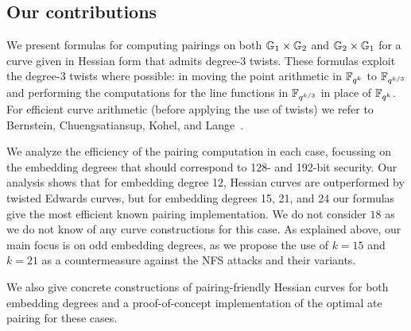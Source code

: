 


\subsection{Our contributions}

We present formulas for computing pairings on both $\mathbb{G}_{1} \times \mathbb{G}_{2}$ and $\mathbb{G}_{2} \times \mathbb{G}_{1}$ for a curve given in Hessian form that admits degree-3 twists.
These formulas exploit the degree-3 twists where possible: in moving the point arithmetic in $\mathbb{F}_{q^k}$ to $\mathbb{F}_{q^{k/3}}$ and performing the computations for the line functions in $\mathbb{F}_{q^{k/3}}$ in place of $\mathbb{F}_{q^k}$.
For efficient curve arithmetic (before applying the use of twists) we refer to
Bernstein, Chuengsatiansup, Kohel, and Lange~\cite{2015/hessian}.

We analyze the efficiency of the pairing computation in each case, focussing on the embedding degrees that should correspond to 128- and 192-bit security. 
Our analysis shows that for embedding degree 12, Hessian curves are outperformed by twisted Edwards curves, but for embedding degrees 15, 21, and 24
our formulas give the most efficient known pairing implementation.
We do not consider $18$ as we do not know of any curve constructions for this case.
As explained above, our main focus is on odd embedding degrees, as we propose 
the use of $k=15$ and $k=21$ as a countermeasure against the NFS attacks and their variants.

We also give concrete constructions of pairing-friendly Hessian curves for both embedding degrees and a proof-of-concept implementation of the optimal ate pairing for these cases. 

